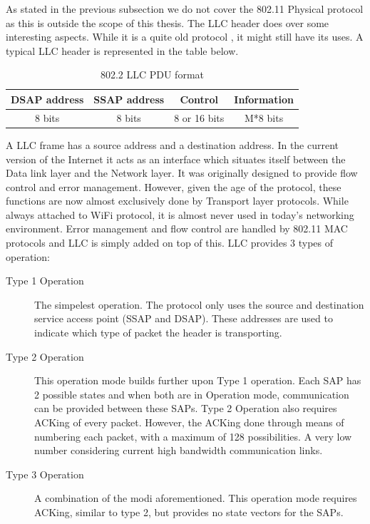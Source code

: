 As stated in the previous subsection we do not cover the 802.11 Physical protocol as this is outside the scope of this thesis. The LLC header does over some interesting aspects. While it is a quite old protocol \citep{ieee8022std}, it might still have its uses. A typical LLC header is represented in the table below. 

\begin{table}[H]
		\begin{center}
		\begin{tabular}{|c|c|c|c|}
			\hline
				\textbf{DSAP address} & \textbf{SSAP address} & \textbf{Control} & \textbf{Information} \\ \hline
				8 bits & 8 bits & 8 or 16 bits & M*8 bits \\ 
			\hline
		\end{tabular}
		\caption{802.2 LLC PDU format}
		\end{center}
\end{table}

A LLC frame has a source address and a destination address. In the current version of the Internet it acts as an interface which situates itself between the Data link layer and the Network layer. It was originally designed to provide flow control and error management. However, given the age of the protocol, these functions are now almost exclusively done by Transport layer protocols. While always attached to WiFi protocol, it is almost never used in today's networking environment. Error management and flow control are handled by 802.11 MAC protocols and LLC is simply added on top of this. LLC provides 3 types of operation:

\begin{description}
	\item[Type 1 Operation] The simpelest operation. The protocol only uses the source and destination service access point (SSAP and DSAP). These addresses are used to indicate which type of packet the header is transporting.
	\item[Type 2 Operation] This operation mode builds further upon Type 1 operation. Each SAP has 2 possible states and when both are in Operation mode, communication can be provided between these SAPs. Type 2 Operation also requires ACKing of every packet. However, the ACKing done through means of numbering each packet, with a maximum of 128 possibilities. A very low number considering current high bandwidth communication links. 
	\item[Type 3 Operation] A combination of the modi aforementioned. This operation mode requires ACKing, similar to type 2, but provides no state vectors for the SAPs.
\end{description}

